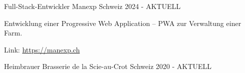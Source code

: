 

\begin{cventries}

    \cventry
    {Full-Stack-Entwickler} %
    {Manexp} %
    {Schweiz} %
    {2024 - AKTUELL} %
    {
      \begin{cvitems} %
        \item {Entwicklung einer Progressive Web Application -- PWA zur Verwaltung einer Farm.}
        \item {Link: \href{https://manexp.ch}{https://manexp.ch}}
      \end{cvitems}
    }

    \cventry
    {Heimbrauer} %
    {Brasserie de la Scie-au-Crot} %
    {Schweiz} %
    {2020 - AKTUELL} %
    {}

\end{cventries}
